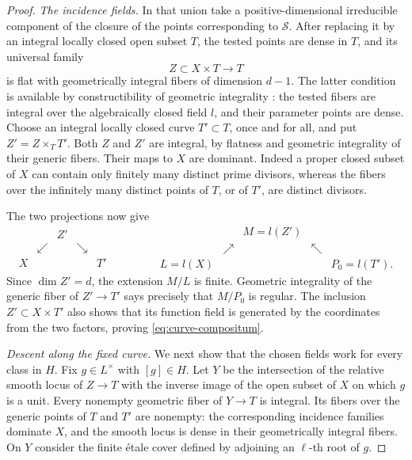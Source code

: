 \begin{proof}
\smallskip\noindent
\emph{The incidence fields.}
In that union take a positive-dimensional irreducible component of the
closure of the points corresponding to $\mathcal S$.  After replacing it
by an integral locally closed open subset $T$, the tested points are dense
in $T$, and its universal family
\[
                            Z\subset X\times T\longrightarrow T
\]
is flat with geometrically integral fibers of dimension $d-1$.  The latter
condition is available by constructibility of geometric integrality
\cite[Tags~\texttt{0579} and~\texttt{055B}]{Stacks}: the
tested fibers are integral over the algebraically closed field $l$, and
their parameter points are dense.  Choose an integral locally closed curve
$T'\subset T$, once and for all, and put $Z'=Z\times_T T'$.
Both $Z$ and $Z'$ are integral, by flatness and geometric integrality of
their generic fibers.  Their maps to $X$ are dominant.  Indeed a proper
closed subset of $X$ can contain only finitely many distinct prime
divisors, whereas the fibers over the infinitely many distinct points of
$T$, or of $T'$, are distinct divisors.

The two projections now give
\[
\begin{array}{ccccc}
 && Z' &&\\[-2pt]
 &\swarrow&&\searrow&\\[-2pt]
 X&&&&T'
\end{array}
\qquad\qquad
\begin{array}{ccccc}
 && M=l(Z') &&\\[-2pt]
 &\nearrow&&\nwarrow&\\[-2pt]
 L=l(X)&&&&P_0=l(T').
\end{array}
\]
Since $\dim Z'=d$, the extension $M/L$ is finite.  Geometric integrality
of the generic fiber of $Z'\to T'$ says precisely that $M/P_0$ is regular.
The inclusion $Z'\subset X\times T'$ also shows that its function field
is generated by the coordinates from the two factors, proving
\eqref{eq:curve-compositum}.

\smallskip\noindent
\emph{Descent along the fixed curve.}
We next show that the chosen fields work for every class in $H$.  Fix
$g\in L^\times$ with $[g]\in H$.  Let $Y$ be the intersection of the
relative smooth locus of $Z\to T$ with the inverse image of the open
subset of $X$ on which $g$ is a unit.  Every nonempty geometric fiber of
$Y\to T$ is integral.  Its fibers over the generic points of $T$ and
$T'$ are nonempty: the corresponding incidence families dominate $X$,
and the smooth locus is dense in their geometrically integral fibers.
On $Y$ consider the finite \'etale cover defined by adjoining an
$\ell$-th root of $g$.


\end{proof}
